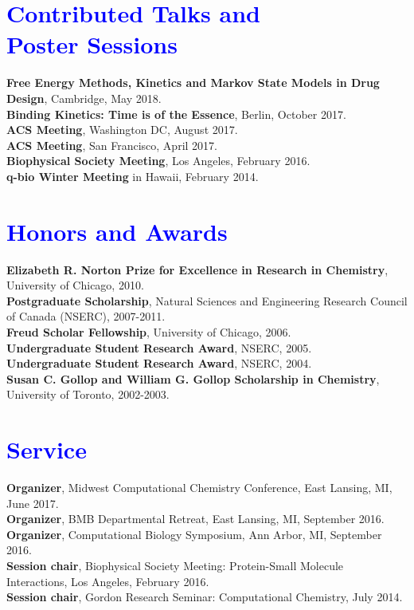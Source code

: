 \documentclass[margin,line]{res}
\begin{document}
\begin{resume}
\section{\sc \textcolor{blue}{ Contributed Talks and \\ Poster Sessions}}

{\bf Free Energy Methods, Kinetics and Markov State Models in Drug Design}, Cambridge, May 2018. \\
{\bf Binding Kinetics: Time is of the Essence}, Berlin, October 2017.\\
{\bf ACS Meeting}, Washington DC, August 2017. \\
{\bf ACS Meeting}, San Francisco, April 2017. \\
{\bf Biophysical Society Meeting}, Los Angeles, February 2016. \\
{\bf q-bio Winter Meeting} in Hawaii, February 2014. \\



\section{\sc \textcolor{blue}{ Honors and Awards} }
{\bf Elizabeth R. Norton Prize for Excellence in Research in Chemistry}, University of Chicago, 2010. \\
{\bf Postgraduate Scholarship}, Natural Sciences and Engineering Research Council of Canada (NSERC), 2007-2011.\\
{\bf Freud Scholar Fellowship}, University of Chicago, 2006. \\
{\bf Undergraduate Student Research Award}, NSERC, 2005. \\
{\bf Undergraduate Student Research Award}, NSERC, 2004. \\
{\bf Susan C. Gollop and William G. Gollop Scholarship in Chemistry}, University of Toronto, 2002-2003. \\

\section{\sc \textcolor{blue}{Service}}
{\bf Organizer}, Midwest Computational Chemistry Conference, East Lansing, MI, June 2017. \\
{\bf Organizer}, BMB Departmental Retreat, East Lansing, MI, September 2016. \\
{\bf Organizer}, Computational Biology Symposium, Ann Arbor, MI, September 2016. \\
{\bf Session chair}, Biophysical Society Meeting: Protein-Small Molecule Interactions, Los Angeles, February 2016. \\
{\bf Session chair}, Gordon Research Seminar: Computational Chemistry, July 2014. \\


\end{resume}
\end{document}
